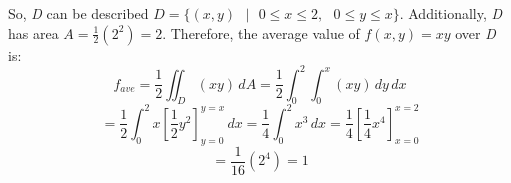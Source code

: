 \begin{Answer}[ref = avg]
\begin{enumerate}
So, \textit{D} can be described $\textit{D} = \{(x, y)\text{ }|\text{ }0 \leq 
x \leq 2,\text{ }0 \leq y \leq x\}$. Additionally, \textit{D} has area $A = 
\frac{1}{2} \left( 2^2 \right) = 2$. Therefore, the average value of $f(x,y) = 
xy$ over \textit{D} is:
$$f_{ave} = \frac{1}{2} \iint_{\textit{D}} \left(xy \right)\,dA = \frac{1}{2} 
\int_0^2 \int_0^x \left(xy \right)\,dy\,dx$$
$$= \frac{1}{2} \int_0^2 x \left[ \frac{1}{2}y^2 \right]_{y = 0}^{y = x}\,dx = 
\frac{1}{4} \int_0^2 x^3\,dx = \frac{1}{4} \left[ \frac{1}{4}x^4 \right]_{x = 0
}^{x = 2}$$
$$= \frac{1}{16} \left(2^4 \right) = 1$$
\end{enumerate}
\end{Answer}

